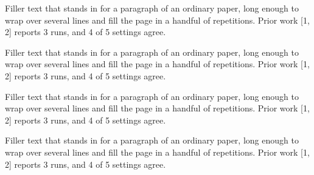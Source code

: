 \documentclass{article}
\begin{document}
Filler text that stands in for a paragraph of an ordinary paper, long enough to wrap over several lines and fill the page in a handful of repetitions. Prior work [1, 2] reports 3 runs, and 4 of 5 settings agree.\par
Filler text that stands in for a paragraph of an ordinary paper, long enough to wrap over several lines and fill the page in a handful of repetitions. Prior work [1, 2] reports 3 runs, and 4 of 5 settings agree.\par
Filler text that stands in for a paragraph of an ordinary paper, long enough to wrap over several lines and fill the page in a handful of repetitions. Prior work [1, 2] reports 3 runs, and 4 of 5 settings agree.\par
Filler text that stands in for a paragraph of an ordinary paper, long enough to wrap over several lines and fill the page in a handful of repetitions. Prior work [1, 2] reports 3 runs, and 4 of 5 settings agree.\par
\end{document}
